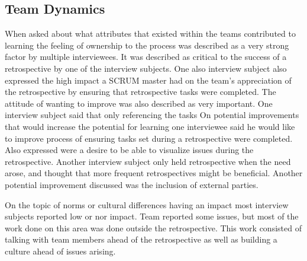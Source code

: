 \begin{table}[!h]
	\begin{center}
	\caption{Learning Reflection}
	\label{table:learning-reflection}
	\end{center}
\end{table}


\subsection{Team Dynamics} %
\label{sub:team_dynamics}

\label{question-17}
When asked about what attributes that existed within the teams contributed to learning the feeling of ownership to the process was described as a very strong factor by multiple interviewees. It was described as critical to the success of a retrospective by one of the interview subjects. One also interview subject also expressed the high impact a SCRUM master had on the team's appreciation of the retrospective by ensuring that retrospective tasks were completed. The attitude of wanting to improve was also described as very important. One interview subject said that only referencing the tasks 
\label{question-18}
On potential improvements that would increase the potential for learning one interviewee said he would like to improve process of ensuring tasks set during a retrospective were completed. Also expressed were a desire to be able to visualize issues during the retrospective.  Another interview subject only held retrospective when the need arose, and thought that more frequent retrospectives might be beneficial. Another potential improvement discussed was the inclusion of external parties. 

\label{question-19}
On the topic of norms or cultural differences having an impact most interview subjects reported low or nor impact. Team  reported some issues, but most of the work done on this area was done outside the retrospective. This work consisted of talking with team members ahead of the retrospective as well as building a culture ahead of issues arising. 

